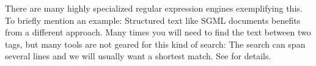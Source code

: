 There are many highly specialized regular expression engines
exemplifying this. To briefly mention an example: Structured text like
SGML documents benefits from a different approach. Many times you will
need to find the text between two tags, but many tools are not geared
for this kind of search: The search can span several lines and we will
usually want a shortest match. See \cite{pedersen2010} for details.



